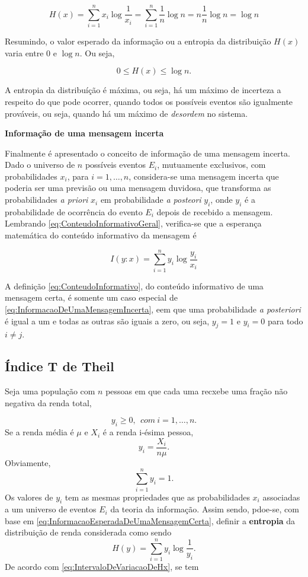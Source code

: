 \documentclass[
]{book}
\begin{document}
\[
  H(x) = \sum_{i=1}^{n} x_i \log \dfrac{1}{x_i} = \sum_{i=1}^{n} \dfrac{1}{n} \log n = n \dfrac{1}{n}\log n = \log n 
\]

Resumindo, o valor esperado da informação ou a entropia da distribuição \(H(x)\) varia entre 0 e \(\log n\). Ou seja,

\[
  0\leq H(x) \leq \log n.
  \label{eq:IntervaloDeVariacaoDeHx}
\]

A entropia da distribuíção é máxima, ou seja, há um máximo de incerteza a respeito do que pode ocorrer, quando todos os possíveis eventos são igualmente prováveis, ou seja, quando há um máximo de \emph{desordem} no sistema.

\textbf{Informação de uma mensagem incerta}

Finalmente é apresentado o conceito de informação de uma mensagem incerta. Dado o universo de \(n\) possíveis eventos \(E_i\), mutuamente exclusivos, com probabilidades \(x_i\), para \(i=1, \ldots, n\), considera-se uma mensagem incerta que poderia ser uma previsão ou uma mensagem duvidosa, que transforma as probabilidades \emph{a priori} \(x_i\) em probabilidade \emph{a posteori} \(y_i\), onde \(y_i\) é a probabilidade de ocorrência do evento \(E_i\) depois de recebido a mensagem. Lembrando
\eqref{eq:ConteudoInformativoGeral}, verifica-se que a esperança matemática do conteúdo informativo da mensagem é

\[
I(y:x) = \sum_{i=1}^{n} y_i \log\dfrac{y_i}{x_i}
\label{eq:InformacaoDeUmaMensagemIncerta}
\]

A definição \eqref{eq:ConteudoInformativo}, do conteúdo informativo de uma mensagem certa, é somente um caso especial de \eqref{eq:InformacaoDeUmaMensagemIncerta}, eem que uma probabilidade \emph{a posteriori} é igual a um e todas as outras são iguais a zero, ou seja, \(y_j = 1\) e \(y_i = 0\) para todo \(i\neq j\).

\hypertarget{uxedndice-t-de-theil}{%
\subsection{Índice T de Theil}\label{uxedndice-t-de-theil}}

Seja uma população com \(n\) pessoas em que cada uma recxebe uma fração não negativa da renda total,

\[
  y_i \geq 0,~~com~i=1,\ldots ,n.
\]
Se a renda média é \(\mu\) e \(X_i\) é a renda i-ésima pessoa,
\[
  y_i = \dfrac{X_i}{n\mu}.
\]
Obviamente,
\[
  \sum_{i=1}^{n} y_i = 1.
\]
Os valores de \(y_i\) tem as mesmas propriedades que as probabilidades \(x_i\) associadas a um universo de eventos \(E_i\) da teoria da informação. Assim sendo, pdoe-se, com base em \eqref{eq:InformacaoEsperadaDeUmaMensagemCerta}, definir a \textbf{entropia} da distribuição de renda considerada como sendo
\[
  H(y) = \sum_{i=1}^{n} y_i \log \dfrac{1}{y_i}.
\]
De acordo com \eqref{eq:IntervaloDeVariacaoDeHx}, se tem
\end{document}
